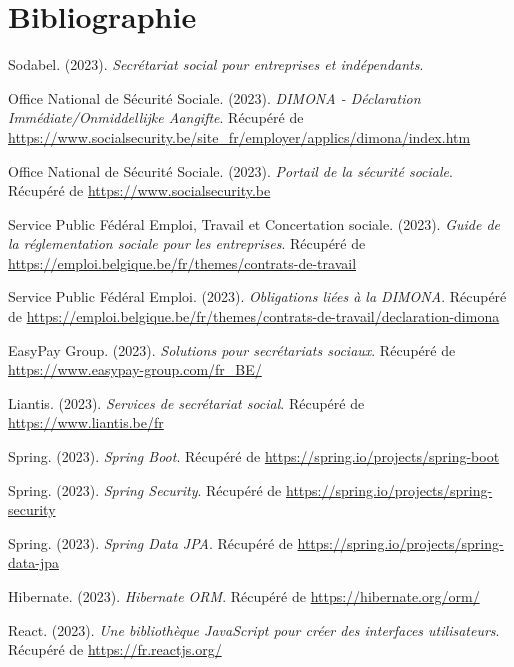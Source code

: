 \chapter*{Bibliographie}

\begin{thebibliography}{99}

Sodabel. (2023).
\textit{Secrétariat social pour entreprises et indépendants}.

Office National de Sécurité Sociale. (2023).
\textit{DIMONA - Déclaration Immédiate/Onmiddellijke Aangifte}.
Récupéré de \url{https://www.socialsecurity.be/site_fr/employer/applics/dimona/index.htm}

Office National de Sécurité Sociale. (2023).
\textit{Portail de la sécurité sociale}.
Récupéré de \url{https://www.socialsecurity.be}

Service Public Fédéral Emploi, Travail et Concertation sociale. (2023).
\textit{Guide de la réglementation sociale pour les entreprises}.
Récupéré de \url{https://emploi.belgique.be/fr/themes/contrats-de-travail}

Service Public Fédéral Emploi. (2023).
\textit{Obligations liées à la DIMONA}.
Récupéré de \url{https://emploi.belgique.be/fr/themes/contrats-de-travail/declaration-dimona}

EasyPay Group. (2023).
\textit{Solutions pour secrétariats sociaux}.
Récupéré de \url{https://www.easypay-group.com/fr_BE/}

Liantis. (2023).
\textit{Services de secrétariat social}.
Récupéré de \url{https://www.liantis.be/fr}

Spring. (2023).
\textit{Spring Boot}.
Récupéré de \url{https://spring.io/projects/spring-boot}

Spring. (2023).
\textit{Spring Security}.
Récupéré de \url{https://spring.io/projects/spring-security}

Spring. (2023).
\textit{Spring Data JPA}.
Récupéré de \url{https://spring.io/projects/spring-data-jpa}

Hibernate. (2023).
\textit{Hibernate ORM}.
Récupéré de \url{https://hibernate.org/orm/}

React. (2023).
\textit{Une bibliothèque JavaScript pour créer des interfaces utilisateurs}.
Récupéré de \url{https://fr.reactjs.org/}


\end{thebibliography}
